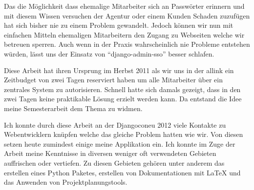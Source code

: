 Das die Möglichkeit dass ehemalige Mitarbeiter sich an Passwörter erinnern und mit diesem Wissen versuchen der Agentur oder einem Kunden Schaden zuzufügen hat sich bisher nie zu einem Problem gewandelt. Jedoch können wir nun mit einfachen Mitteln ehemaligen Mitarbeitern den Zugang zu Webseiten welche wir betreuen sperren. Auch wenn in der Praxis wahrscheinlich nie Probleme entstehen würden, lässt uns der Einsatz von ``django-admin-sso'' besser schlafen.

Diese Arbeit hat ihren Ursprung im Herbst 2011 als wir uns in der allink ein Zeitbudget von zwei Tagen reserviert haben um alle Mitarbeiter über ein zentrales System zu autorisieren. Schnell hatte sich damals gezeigt, dass in den zwei Tagen keine praktikable Lösung erzielt werden kann. Da entstand die Idee meine Semesterarbeit dem Thema zu widmen.

Ich konnte durch diese Arbeit an der Djangoconeu 2012 viele Kontakte zu Webentwicklern knüpfen welche das gleiche Problem hatten wie wir. Von diesen setzen heute zumindest einige meine Applikation ein. Ich konnte im Zuge der Arbeit meine Kenntnisse in diversen weniger oft verwendeten Gebieten auffrischen oder vertiefen. Zu diesen Gebieten gehören unter anderem das erstellen eines Python Paketes, erstellen von Dokumentationen mit LaTeX und das Anwenden von Projektplanungstools.